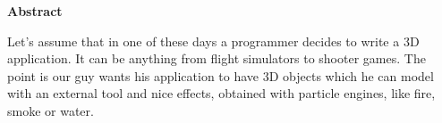 \thispagestyle{plain}

\begin{center}
	\textbf{Abstract}
\end{center}

Let's assume that in one of these days a programmer decides to write a 3D application. It can be anything from flight simulators to shooter games. The point is our guy wants his application to have 3D objects which he can model with an external tool and nice effects, obtained with particle engines, like fire, smoke or water.